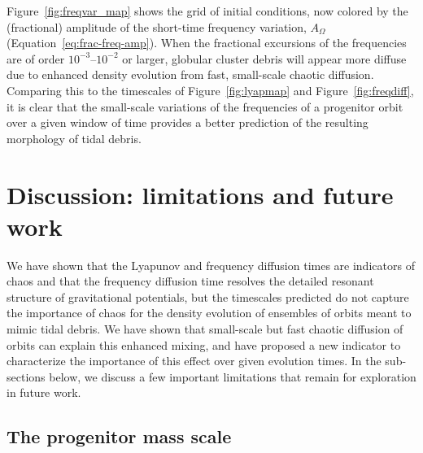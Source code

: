\documentclass[letterpaper,12pt,preprint]{aastex}
\begin{document}
Figure~\ref{fig:freqvar_map} shows the grid of initial conditions, now colored by the (fractional) amplitude of the short-time frequency variation, $A_\Omega$ (Equation~\ref{eq:frac-freq-amp}). When the fractional excursions of the frequencies are of order $10^{-3}$--$10^{-2}$ or larger, globular cluster debris will appear more diffuse due to enhanced density evolution from fast, small-scale chaotic diffusion. Comparing this to the timescales of Figure~\ref{fig:lyapmap} and Figure~\ref{fig:freqdiff}, it is clear that the small-scale variations of the frequencies of a progenitor orbit over a given window of time provides a better prediction of the resulting morphology of tidal debris. 

\section{Discussion: limitations and future work}\label{sec:discussion}


We have shown that the Lyapunov and frequency diffusion times are indicators of chaos and that the frequency diffusion time resolves the detailed resonant structure of gravitational potentials, but the timescales predicted do not capture the importance of chaos for the density evolution of ensembles of orbits meant to mimic tidal debris. We have shown that small-scale but fast chaotic diffusion of orbits can explain this enhanced mixing, and have proposed a new indicator to characterize the importance of this effect over given evolution times. In the sub-sections below, we discuss a few important limitations that remain for exploration in future work.

\subsection{The progenitor mass scale}
\end{document}
